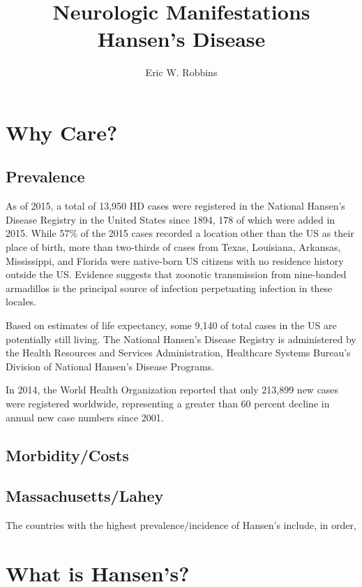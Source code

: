 \documentclass{article}
\title{Neurologic Manifestations Hansen's Disease}
\author{Eric W. Robbins}
\date{}
\begin{document}
\maketitle
\tableofcontents
\newpage
\section{Why Care?}
\subsection{Prevalence}
As of 2015, a total of 13,950 HD cases were registered in the National Hansen’s Disease Registry in the United States since 1894, 178 of which were added in 2015.  While 57\% of the 2015 cases recorded a location other than the US as their place of birth, more than two-thirds of cases from Texas, Louisiana, Arkansas, Mississippi, and Florida were native-born US citizens with no residence history outside the US. Evidence suggests that zoonotic transmission from nine-banded armadillos is the principal source of infection perpetuating infection in these locales. 

Based on estimates of life expectancy, some 9,140 of total cases in the US are potentially still living.  The National Hansen’s Disease Registry is administered by the Health Resources and Services Administration, Healthcare Systems Bureau’s Division of National Hansen’s Disease Programs.  

In 2014, the World Health Organization reported that only 213,899 new cases were registered worldwide, representing a greater than 60 percent decline in annual new case numbers since 2001. 

\subsection{Morbidity/Costs}
\subsection{Massachusetts/Lahey}
The countries with the highest prevalence/incidence of Hansen's include, in order, 
\section{What is Hansen's?}
\end{document}
